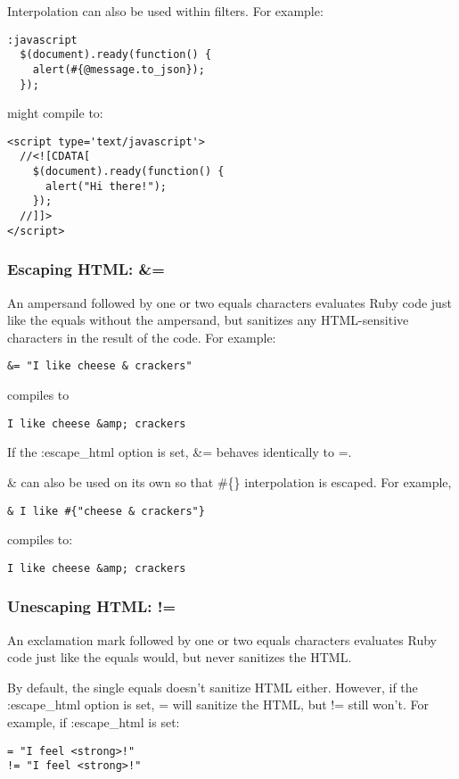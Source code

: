 \documentclass[10pt]{article}
\begin{document}
 Interpolation can also be used within filters. For example:
\begin{verbatim}
:javascript
  $(document).ready(function() {
    alert(#{@message.to_json});
  });
\end{verbatim}


 might compile to:
\begin{verbatim}
<script type='text/javascript'>
  //<![CDATA[
    $(document).ready(function() {
      alert("Hi there!");
    });
  //]]>
</script>
\end{verbatim}
\subsubsection*{Escaping HTML: \&=}


 An ampersand followed by one or two equals characters evaluates Ruby code just like the equals without the ampersand, but sanitizes any HTML-sensitive characters in the result of the code. For example:
\begin{verbatim}
&= "I like cheese & crackers"
\end{verbatim}


 compiles to
\begin{verbatim}
I like cheese &amp; crackers
\end{verbatim}


 If the :escape\_html option is set, \&= behaves identically to =.


 \& can also be used on its own so that \#\{\} interpolation is escaped. For example,
\begin{verbatim}
& I like #{"cheese & crackers"}
\end{verbatim}


 compiles to:
\begin{verbatim}
I like cheese &amp; crackers
\end{verbatim}
\subsubsection*{Unescaping HTML: !=}


 An exclamation mark followed by one or two equals characters evaluates Ruby code just like the equals would, but never sanitizes the HTML.


 By default, the single equals doesn’t sanitize HTML either. However, if the :escape\_html option is set, = will sanitize the HTML, but != still won’t. For example, if :escape\_html is set:
\begin{verbatim}
= "I feel <strong>!"
!= "I feel <strong>!"
\end{verbatim}
\end{document}
